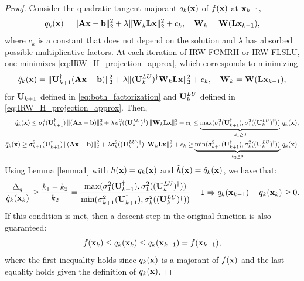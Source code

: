 \documentclass[11pt]{article}
\numberwithin{equation}{section}
\newcommand{\bfA}{{\bf A}}
\newcommand{\bfL}{{\bf L}}
\newcommand{\bfU}{{\bf U}}
\newcommand{\bfW}{{\bf W}}
\newcommand{\bfb}{{\bf b}}
\newcommand{\bfx}{{\bf x}}
\begin{document}
\begin{proof}
Consider the quadratic tangent majorant  $q_k(\bfx)$ of $f(\bfx)$ at $\bfx_{k-1},$ 
\begin{equation*}
   q_k(\bfx) = \| \bfA \bfx - \bfb \|_2^2 + \lambda \|\bfW_k \bfL \bfx \|_2^2 + c_k, \quad \bfW_k =\bfW(\bfL \bfx_{k-1}),
\end{equation*}
where $c_k$ is a constant that does not depend on the solution and $\lambda$ has absorbed possible multiplicative factors. At each iteration of IRW-FCMRH or IRW-FLSLU, one minimizes \eqref{eq:IRW_H_projection_approx}, which corresponds to minimizing 
\begin{equation*}
   \hat q_k(\bfx) = \| \bfU_{k+1}^{\dagger} (\bfA \bfx - \bfb) \|_2^2 + \lambda \|(\bfU_{k}^{LU})^{\dagger} \bfW_k \bfL \bfx \|_2^2 + c_k, \quad \bfW_k =\bfW(\bfL \bfx_{k-1}),
\end{equation*}
for $\bfU_{k+1}$ defined in  \eqref{eq:both_factorization} and $\bfU^{LU}_{k}$ defined in \eqref{eq:IRW_H_projection_approx}. Then,
\begin{eqnarray*}
   \hat q_k(\bfx) \leq \sigma_1^2(\bfU_{k+1}^{\dagger})\, \| (\bfA \bfx - \bfb) \|_2^2 + \lambda \,\sigma_1^2((\bfU_{k}^{LU})^{\dagger} )\, \|\bfW_k \bfL \bfx \|_2^2  + c_k  \leq \underbrace{\max(\sigma_1^2(\bfU_{k+1}^{\dagger}),\sigma_1^2((\bfU_{k}^{LU})^{\dagger}))}_{k_1 \geq 0 } \, q_k(\bfx), \\
 \hat q_k(\bfx) \geq \sigma_{k+1}^2(\bfU_{k+1}^{\dagger})\, \| (\bfA \bfx - \bfb) \|_2^2 + \lambda \sigma_{k}^2((\bfU_{k}^{LU})^{\dagger}) \|\bfW_k \bfL \bfx \|_2^2  + c_k  \geq \underbrace{\min(\sigma_{k+1}^2(\bfU_{k+1}^{\dagger}),\sigma_k^2((\bfU_{k}^{LU})^{\dagger}))}_{k_2 \geq 0 } \, q_k(\bfx).
\end{eqnarray*}
Using Lemma \ref{lemma1} with $h(\bfx) = q_{k}(\bfx) $ and $\hat h(\bfx) = \hat q_{k}(\bfx) $, we have that:
\[\frac{\Delta_q}{\hat q_k(\bfx_{k})} \geq \frac{k_1-k_2}{k_2}= \frac{\max(\sigma_1^2(\bfU_{k+1}^{\dagger}),\sigma_1^2((\bfU_{k}^{LU})^{\dagger}))}{\min(\sigma_{k+1}^2(\bfU_{k+1}^{\dagger}),\sigma_k^2((\bfU_{k}^{LU})^{\dagger}))}-1 \Rightarrow  q_k(\bfx_{k-1}) - q_k(\bfx_{k}) \geq 0.\]
If this condition is met, then a descent step in the original function is also guaranteed:
\[f(\bfx_{k}) \leq q_k(\bfx_{k}) \leq q_k(\bfx_{k-1}) = f(\bfx_{k-1}), 
\]
where the first inequality holds since $ q_k(\bfx)$ is a majorant of $f(\bfx)$ and the last equality holds given the definition of $ q_k(\bfx)$. 
\end{proof}
\end{document}
